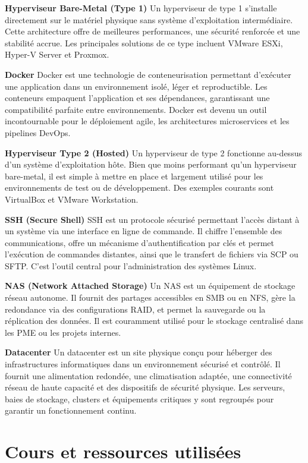\textbf{Hyperviseur Bare-Metal (Type 1)}
Un hyperviseur de type 1 s'installe directement sur le matériel physique sans système d'exploitation intermédiaire. Cette architecture offre de meilleures performances, une sécurité renforcée et une stabilité accrue. Les principales solutions de ce type incluent VMware ESXi, Hyper-V Server et Proxmox.

\textbf{Docker}
Docker est une technologie de conteneurisation permettant d'exécuter une application dans un environnement isolé, léger et reproductible. Les conteneurs empaquent l'application et ses dépendances, garantissant une compatibilité parfaite entre environnements. Docker est devenu un outil incontournable pour le déploiement agile, les architectures microservices et les pipelines DevOps.

\textbf{Hyperviseur Type 2 (Hosted)}
Un hyperviseur de type 2 fonctionne au-dessus d'un système d'exploitation hôte. Bien que moins performant qu'un hyperviseur bare-metal, il est simple à mettre en place et largement utilisé pour les environnements de test ou de développement. Des exemples courants sont VirtualBox et VMware Workstation.

\textbf{SSH (Secure Shell)}
SSH est un protocole sécurisé permettant l'accès distant à un système via une interface en ligne de commande. Il chiffre l'ensemble des communications, offre un mécanisme d'authentification par clés et permet l'exécution de commandes distantes, ainsi que le transfert de fichiers via SCP ou SFTP. C'est l'outil central pour l'administration des systèmes Linux.

\textbf{NAS (Network Attached Storage)}
Un NAS est un équipement de stockage réseau autonome. Il fournit des partages accessibles en SMB ou en NFS, gère la redondance via des configurations RAID, et permet la sauvegarde ou la réplication des données. Il est couramment utilisé pour le stockage centralisé dans les PME ou les projets internes.

\textbf{Datacenter}
Un datacenter est un site physique conçu pour héberger des infrastructures informatiques dans un environnement sécurisé et contrôlé. Il fournit une alimentation redondée, une climatisation adaptée, une connectivité réseau de haute capacité et des dispositifs de sécurité physique. Les serveurs, baies de stockage, clusters et équipements critiques y sont regroupés pour garantir un fonctionnement continu.

\newpage

\section*{Cours et ressources utilisées}

